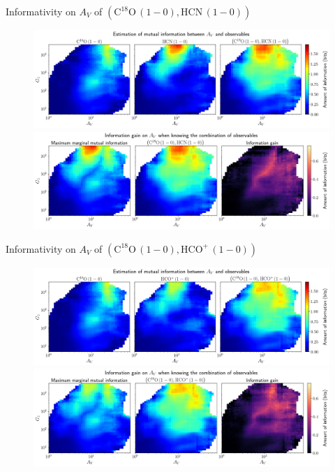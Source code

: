 \documentclass{beamer}
\begin{document}
\begin{frame}{Informativity on $A_V$ of $\left(\mathrm{C^{18}O\,(1-0)},\mathrm{HCN\,(1-0)}\right)$}
    \begin{figure}
        \centering
        \includegraphics[width=0.95\linewidth]{../mi/av__c18o10_hcn10_mi.png}
        \vfill
        \includegraphics[width=0.95\linewidth]{../mi/av__c18o10_hcn10_mi_gain.png}
    \end{figure}
\end{frame}

\begin{frame}{Informativity on $A_V$ of $\left(\mathrm{C^{18}O\,(1-0)},\mathrm{HCO^+\,(1-0)}\right)$}
    \begin{figure}
        \centering
        \includegraphics[width=0.95\linewidth]{../mi/av__c18o10_hcop10_mi.png}
        \vfill
        \includegraphics[width=0.95\linewidth]{../mi/av__c18o10_hcop10_mi_gain.png}
    \end{figure}
\end{frame}
\end{document}
